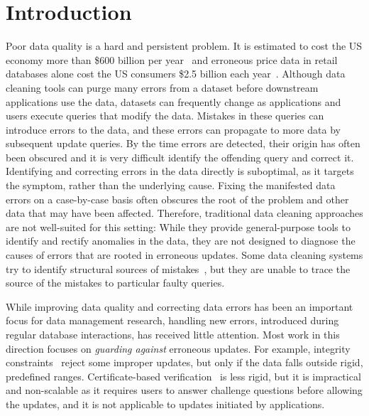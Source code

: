 
\section{Introduction}
\label{s:intro}

Poor data quality is a hard and persistent problem.  
It is estimated to cost the US economy more than \$600 billion
per year~\cite{eckerson2002} and erroneous price data in retail databases
alone cost the US consumers \$2.5 billion each year~\cite{Fan2008}. 
Although data
cleaning tools can purge many errors from a dataset before downstream 
applications use the data, datasets can frequently change as applications
and users execute queries that modify the data.
Mistakes in these queries can introduce errors to the data, and these
errors can propagate to more data by subsequent update queries.
By the time errors are detected, their origin has often been obscured and it is very difficult identify the offending query and correct it.
Identifying and correcting errors in the data directly is suboptimal, as it targets the symptom,
rather than the underlying cause. Fixing the manifested data errors on a
case-by-case basis often obscures the root of the problem and other data that may have been
affected. Therefore, traditional data cleaning approaches are not well-suited
for this setting: While they provide general-purpose tools to identify and
rectify anomalies in the data, they are not designed to diagnose the causes of
errors that are rooted in erroneous updates.
Some data cleaning systems try to identify structural sources of
mistakes~\cite{wang2015}, but they are unable to trace the source of
the mistakes to particular faulty queries.

While improving data quality and correcting data errors has been an important
focus for data management research, handling new errors, introduced during
regular database interactions, has received little attention. Most work in
this direction focuses on \emph{guarding against} erroneous updates. For
example, integrity constraints~\cite{Khoussainova2006} reject some improper
updates, 
but only if the data falls outside rigid, predefined ranges.
Certificate-based verification~\cite{Chen2011} is less rigid, but it is
impractical and non-scalable as it requires users to answer challenge
questions before allowing the updates, and it is not applicable to updates
initiated by applications.

